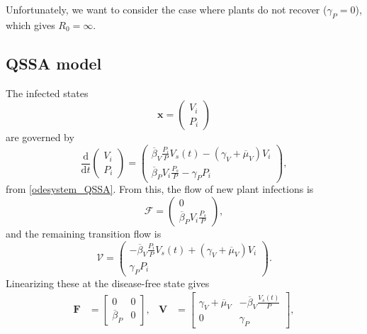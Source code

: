 \documentclass{article}
\newcommand{\md}{\mathrm{d}}
\newcommand{\mat}[1]{\mathbf{#1}}
\renewcommand{\vec}[1]{\mathbf{#1}}
\begin{document}
Unfortunately, we want to consider the case where plants do not
recover ($\gamma_P = 0$), which gives $R_0 = \infty$.

\subsection{QSSA model}

The infected states
\begin{equation}
  \vec{x} =
  \begin{pmatrix}
    V_i \\ P_i
  \end{pmatrix}
\end{equation}
are governed by
\begin{equation}
  \label{infectedsystem}
  \frac{\md}{\md t}
  \begin{pmatrix}
    V_i \\ P_i
  \end{pmatrix}
  =
  \begin{pmatrix}
    \overline{\beta}_V \frac{P_i}{P} V_s(t)
    - (\gamma_V + \overline{\mu}_V) V_i
    \\
    \overline{\beta}_P V_{i} \frac{P_s}{P}
    - \gamma_P P_i
  \end{pmatrix},
\end{equation}
from \eqref{odesystem_QSSA}.  From this, the flow of new plant
infections is
\begin{equation}
  \mathcal{F} =
  \begin{pmatrix}
    0
    \\
    \overline{\beta}_P V_{i} \frac{P_s}{P}
  \end{pmatrix},
\end{equation}
and the remaining transition flow is
\begin{equation}
  \mathcal{V} =
  \begin{pmatrix}
    - \overline{\beta}_V \frac{P_i}{P} V_s(t)
    +(\gamma_V + \overline{\mu}_V) V_i
    \\
    \gamma_P P_i
  \end{pmatrix}.
\end{equation}
Linearizing these at the disease-free state gives
\begin{align}
  \mat{F} &=
  \begin{bmatrix}
    0 & 0
    \\
    \overline{\beta}_P & 0
  \end{bmatrix}, & \mat{V} &=
  \begin{bmatrix}
    \gamma_V + \overline{\mu}_V
    & - \overline{\beta}_V \frac{V_s(t)}{P}
    \\
    0 & \gamma_P
  \end{bmatrix},
\end{align}
\end{document}

